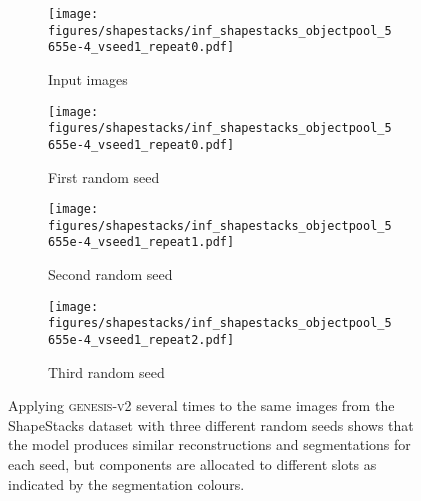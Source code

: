 \documentclass{article}
\begin{document}
\begin{figure}[h!]
	\centering
	\begin{subfigure}{\linewidth}
        \texttt{[image: figures/shapestacks/inf\_shapestacks\_objectpool\_5655e-4\_vseed1\_repeat0.pdf]}
        \caption{Input images}
        \vspace{6pt}
	\end{subfigure}
	\begin{subfigure}{\linewidth}
        \texttt{[image: figures/shapestacks/inf\_shapestacks\_objectpool\_5655e-4\_vseed1\_repeat0.pdf]}
        \caption{First random seed}
        \vspace{6pt}
	\end{subfigure}
	\begin{subfigure}{\linewidth}
        \texttt{[image: figures/shapestacks/inf\_shapestacks\_objectpool\_5655e-4\_vseed1\_repeat1.pdf]}
        \caption{Second random seed}
        \vspace{6pt}
	\end{subfigure}
	\begin{subfigure}{\linewidth}
        \texttt{[image: figures/shapestacks/inf\_shapestacks\_objectpool\_5655e-4\_vseed1\_repeat2.pdf]}
        \caption{Third random seed}
        \vspace{6pt}
	\end{subfigure}
	\caption{Applying \textsc{genesis-v2} several times to the same images from the ShapeStacks dataset with three different random seeds shows that the model produces similar reconstructions and segmentations for each seed, but components are allocated to different slots as indicated by the segmentation colours.}
\end{figure}
\end{document}
